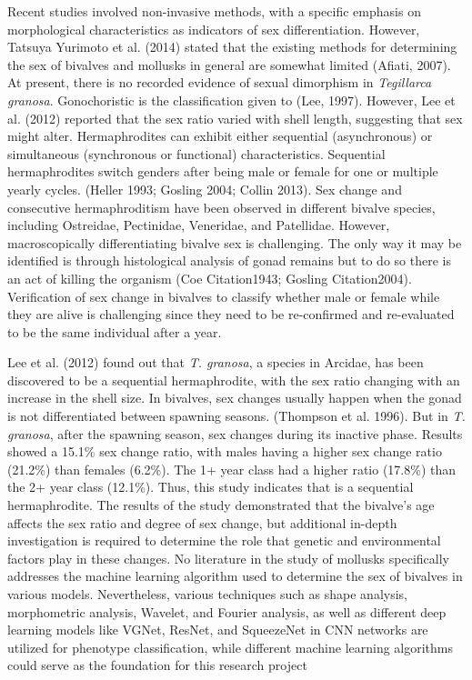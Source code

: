 Recent studies involved non-invasive methods, with a specific emphasis on morphological characteristics as indicators of sex differentiation. However,  Tatsuya Yurimoto et al. (2014) stated that the existing methods for determining the sex of bivalves and mollusks in general are somewhat limited (Afiati, 2007). At present, there is no recorded evidence of sexual dimorphism in \textit{Tegillarca granosa}. Gonochoristic is the classification given to \Tegillarcagranosa (Lee, 1997). However, Lee et al. (2012) reported that the sex ratio varied with shell length, suggesting that sex might alter. 
Hermaphrodites can exhibit either sequential (asynchronous) or simultaneous (synchronous or functional) characteristics. Sequential hermaphrodites switch genders after being male or female for one or multiple yearly cycles. (Heller 1993; Gosling 2004; Collin 2013). Sex change and consecutive hermaphroditism have been observed in different bivalve species, including Ostreidae, Pectinidae, Veneridae, and Patellidae. However, macroscopically differentiating bivalve sex is challenging. The only way it may be identified is through histological analysis of gonad remains but to do so there is an act of killing the organism (Coe Citation1943; Gosling Citation2004). Verification of sex change in bivalves to classify whether male or female while they are alive is challenging since they need to be re-confirmed and re-evaluated to be the same individual after a year.

Lee et al. (2012) found out that \textit{T. granosa}, a species in Arcidae, has been discovered to be a sequential hermaphrodite, with the sex ratio changing with an increase in the shell size. In bivalves, sex changes usually happen when the gonad is not differentiated between spawning seasons. (Thompson et al. 1996). But in \textit{T. granosa}, after the spawning season, sex changes during its inactive phase. Results showed a 15.1\% sex change ratio, with males having a higher sex change ratio (21.2\%) than females (6.2\%). The 1+ year class had a higher ratio (17.8\%) than the 2+ year class (12.1\%). Thus, this study indicates that \Tgranosa is a sequential hermaphrodite. The results of the study demonstrated that the bivalve's age affects the sex ratio and degree of sex change, but additional in-depth investigation is required to determine the role that genetic and environmental factors play in these changes.
No literature in the study of mollusks specifically addresses the machine learning algorithm used to determine the sex of \Tgranosa bivalves in various models. Nevertheless, various techniques such as shape analysis, morphometric analysis, Wavelet, and Fourier analysis, as well as different deep learning models like VGNet, ResNet, and SqueezeNet in CNN networks are utilized for phenotype classification, while different machine learning algorithms could serve as the foundation for this research project


